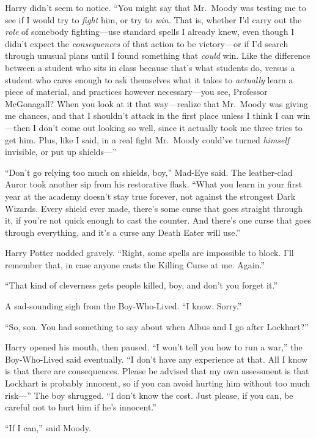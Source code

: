 Harry didn’t seem to notice. “You might say that Mr.~Moody was testing me to see if I would try to \emph{fight} him, or try to \emph{win.} That is, whether I’d carry out the \emph{role} of somebody fighting—use standard spells I already knew, even though I didn’t expect the \emph{consequences} of that action to be victory—or if I’d search through unusual plans until I found something that \emph{could} win. Like the difference between a student who sits in class because that’s what students do, versus a student who cares enough to ask themselves what it takes to \emph{actually} learn a piece of material, and practices however necessary—you see, Professor McGonagall? When you look at it that way—realize that Mr.~Moody was giving me chances, and that I shouldn’t attack in the first place unless I think I can win—then I don’t come out looking so well, since it actually took me three tries to get him. Plus, like I said, in a real fight Mr.~Moody could’ve turned \emph{himself} invisible, or put up shields—”

“Don’t go relying too much on shields, boy,” Mad-Eye said. The leather-clad Auror took another sip from his restorative flask. “What you learn in your first year at the academy doesn’t stay true forever, not against the strongest Dark Wizards. Every shield ever made, there’s some curse that goes straight through it, if you’re not quick enough to cast the counter. And there’s one curse that goes through everything, and it’s a curse any Death Eater will use.”

Harry Potter nodded gravely. “Right, some spells are impossible to block. I’ll remember that, in case anyone casts the Killing Curse at me. Again.”

“That kind of cleverness gets people killed, boy, and don’t you forget it.”

A sad-sounding sigh from the Boy-Who-Lived. “I know. Sorry.”

“So, son. You had something to say about when Albus and I go after Lockhart?”

Harry opened his mouth, then paused. “I won’t tell you how to run a war,” the Boy-Who-Lived said eventually. “I don’t have any experience at that. All I know is that there are consequences. Please be advised that my own assessment is that Lockhart is probably innocent, so if you can avoid hurting him without too much risk—” The boy shrugged. “I don’t know the cost. Just please, if you can, be careful not to hurt him if he’s innocent.”

“If I can,” said Moody.

